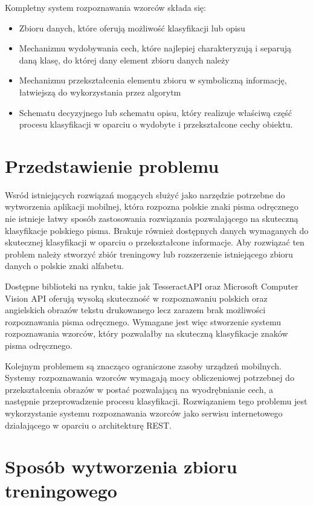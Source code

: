 \documentclass[brudnopis]{xmgr}
\begin{document}
Kompletny system rozpoznawania wzorców składa się:
\begin{itemize}
\item
Zbioru danych, które oferują możliwość klasyfikacji lub opisu
\item
Mechanizmu wydobywania cech, które najlepiej charakteryzują i separują daną klasę, do której dany element zbioru danych należy
\item
Mechanizmu przekształcenia elementu zbioru w symboliczną informację, łatwiejszą do wykorzystania przez algorytm
\item
Schematu decyzyjnego lub schematu opisu, który realizuje właściwą część procesu klasyfikacji w oparciu o wydobyte i przekształcone cechy obiektu.
\end{itemize}

\section{Przedstawienie problemu}

Wsród istniejących rozwiązań mogących służyć jako narzędzie potrzebne do wytworzenia aplikacji mobilnej, która rozpozna polskie znaki pisma odręcznego nie istnieje łatwy sposób zastosowania rozwiązania pozwalającego na skuteczną klasyfikacje polskiego pisma. Brakuje również dostępnych danych wymaganych do skutecznej klasyfikacji w oparciu o przekształcone informacje. Aby rozwiązać ten problem należy stworzyć zbiór treningowy lub rozszerzenie istniejącego zbioru danych o polskie znaki alfabetu.

Dostępne biblioteki na rynku, takie jak TesseractAPI oraz Microsoft Computer Vision API oferują wysoką skuteczność w rozpoznawaniu polskich oraz angielskich obrazów tekstu drukowanego lecz zarazem brak możliwości rozpoznawania pisma odręcznego. Wymagane jest więc stworzenie systemu rozpoznawania wzorców, który pozwalałby na skuteczną klasyfikacje znaków pisma odręcznego.

Kolejnym problemem są znacząco ograniczone zasoby urządzeń mobilnych. Systemy rozpoznawania wzorców wymagają mocy obliczeniowej potrzebnej do przekształcenia obrazów w postać pozwalającą na wyodrębnianie cech, a następnie przeprowadzenie procesu klasyfikacji. Rozwiązaniem tego problemu jest wykorzystanie systemu rozpoznawania wzorców jako serwisu internetowego działającego w oparciu o architekturę REST.

\section{Sposób wytworzenia zbioru treningowego}
\end{document}
